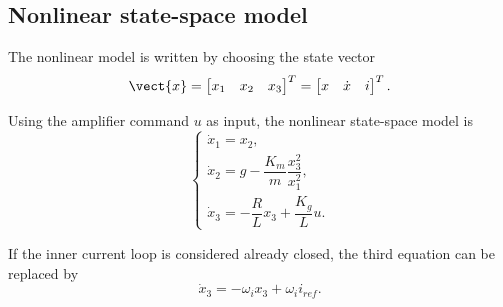 \subsection{Nonlinear state-space model}

The nonlinear model is written by choosing the state vector
\begin{equation}
    \vect{x} = \begin{bmatrix} x_1 & x_2 & x_3 \end{bmatrix}^T
    = \begin{bmatrix} x & \dot{x} & i \end{bmatrix}^T.
\end{equation}

Using the amplifier command $u$ as input, the nonlinear state-space model is
\begin{equation}
\begin{cases}
    \dot{x}_1 = x_2, \\
    \dot{x}_2 = g - \dfrac{K_m}{m}\dfrac{x_3^2}{x_1^2}, \\
    \dot{x}_3 = -\dfrac{R}{L}x_3 + \dfrac{K_g}{L}u.
\end{cases}
\label{eq:nonlinear_ss}
\end{equation}

If the inner current loop is considered already closed, the third equation can be replaced by
\begin{equation}
    \dot{x}_3 = -\omega_i x_3 + \omega_i i_{ref}.
    \label{eq:current_loop_state}
\end{equation}
